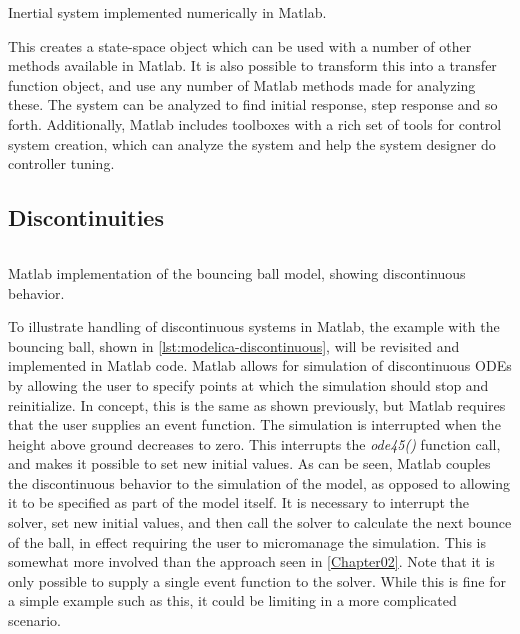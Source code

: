 \documentclass[\rootfolder/main.tex]{subfiles}
\begin{document}
\begin{listing}[ht]
    \inputminted{matlab}{\rootfolder/Models/Matlab/InertialMatlab.m}
    \caption{Inertial system implemented numerically in Matlab.\label{lst:matlab-inertial}}
\end{listing}

This creates a state-space object which can be used with a number of other methods available in Matlab.
It is also possible to transform this into a transfer function object, and use any number of Matlab methods made for analyzing these.
The system can be analyzed to find initial response, step response and so forth.
Additionally, Matlab includes toolboxes with a rich set of tools for control system creation, which can analyze the system and help the system designer do controller tuning.

\subsection{Discontinuities}

\begin{listing}[ht]
    \inputminted{matlab}{\rootfolder/Models/Matlab/BouncingBall.m}
    \caption{Matlab implementation of the bouncing ball model, showing discontinuous behavior.\label{lst:matlab-discontinuous}}
\end{listing}

To illustrate handling of discontinuous systems in Matlab, the example with the bouncing ball, shown in \cref{lst:modelica-discontinuous}, will be revisited and implemented in Matlab code.
Matlab allows for simulation of discontinuous ODEs by allowing the user to specify points at which the simulation should stop and reinitialize.
In concept, this is the same as shown previously, but Matlab requires that the user supplies an event function.
The simulation is interrupted when the height above ground decreases to zero.
This interrupts the \emph{ode45()} function call, and makes it possible to set new initial values.
As can be seen, Matlab couples the discontinuous behavior to the simulation of the model, as opposed to allowing it to be specified as part of the model itself.
It is necessary to interrupt the solver, set new initial values, and then call the solver to calculate the next bounce of the ball, in effect requiring the user to micromanage the simulation.
This is somewhat more involved than the approach seen in \cref{Chapter02}.
Note that it is only possible to supply a single event function to the solver.
While this is fine for a simple example such as this, it could be limiting in a more complicated scenario.
\end{document}

